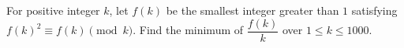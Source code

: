 For positive integer $k$, let $f(k)$ be the smallest integer greater than $1$ satisfying $f(k)^2\equiv f(k)\pmod k$. Find the minimum of $\dfrac{f(k)}{k}$ over $1\le k\le1000$.
